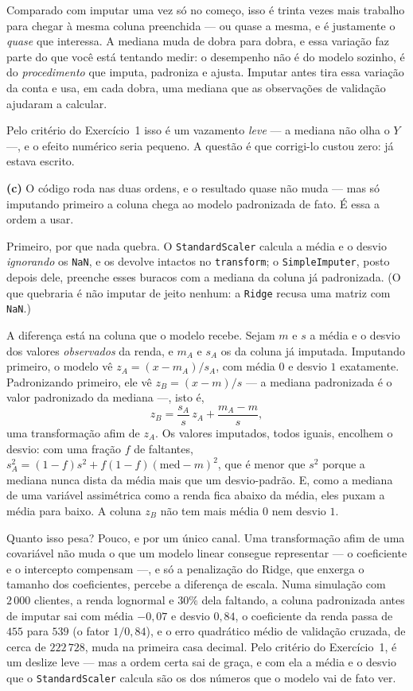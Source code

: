 \documentclass[11pt,a4paper]{article}
\begin{document}
\begin{solucao}
Comparado com imputar uma vez só no começo, isso é trinta vezes mais trabalho para
chegar à mesma coluna preenchida --- ou quase a mesma, e é justamente o
\emph{quase} que interessa. A mediana muda de dobra para dobra, e essa variação faz
parte do que você está tentando medir: o desempenho não é do modelo sozinho, é do
\emph{procedimento} que imputa, padroniza e ajusta. Imputar antes tira essa
variação da conta e usa, em cada dobra, uma mediana que as observações de
validação ajudaram a calcular.

Pelo critério do Exercício~1 isso é um vazamento \emph{leve} --- a mediana não olha
o $Y$ ---, e o efeito numérico seria pequeno. A questão é que corrigi-lo custou
zero: já estava escrito.

\smallskip
\textbf{(c)} O código roda nas duas ordens, e o resultado quase não muda --- mas
só imputando primeiro a coluna chega ao modelo padronizada de fato. É essa a ordem
a usar.

Primeiro, por que nada quebra. O \texttt{StandardScaler} calcula a média e o desvio
\emph{ignorando} os \texttt{NaN}, e os devolve intactos no \texttt{transform}; o
\texttt{SimpleImputer}, posto depois dele, preenche esses buracos com a mediana da
coluna já padronizada. (O que quebraria é não imputar de jeito nenhum: a
\texttt{Ridge} recusa uma matriz com \texttt{NaN}.)

A diferença está na coluna que o modelo recebe. Sejam $m$ e $s$ a média e o desvio
dos valores \emph{observados} da renda, e $m_A$ e $s_A$ os da coluna já imputada.
Imputando primeiro, o modelo vê $z_A=(x-m_A)/s_A$, com média $0$ e desvio $1$
exatamente. Padronizando primeiro, ele vê $z_B=(x-m)/s$ --- a mediana padronizada é
o valor padronizado da mediana ---, isto é,
\[
  z_B = \frac{s_A}{s}\,z_A + \frac{m_A-m}{s} ,
\]
uma transformação afim de $z_A$. Os valores imputados, todos iguais, encolhem o
desvio: com uma fração $f$ de faltantes,
$s_A^2=(1-f)s^2+f(1-f)(\mathrm{med}-m)^2$, que é menor que $s^2$ porque a mediana
nunca dista da média mais que um desvio-padrão. E, como a mediana de uma variável
assimétrica como a renda fica abaixo da média, eles puxam a média para baixo. A
coluna $z_B$ não tem mais média $0$ nem desvio $1$.

Quanto isso pesa? Pouco, e por um único canal. Uma transformação afim de uma
covariável não muda o que um modelo linear consegue representar --- o coeficiente e
o intercepto compensam ---, e só a penalização do Ridge, que enxerga o tamanho dos
coeficientes, percebe a diferença de escala. Numa simulação com $2\,000$ clientes, a
renda lognormal e $30\%$ dela faltando, a coluna padronizada antes de imputar sai com
média $-0{,}07$ e desvio $0{,}84$, o coeficiente da renda passa de $455$ para $539$
(o fator $1/0{,}84$), e o erro quadrático médio de validação cruzada, de cerca de
$222\,728$, muda na primeira casa decimal. Pelo critério
do Exercício~1, é um deslize leve --- mas a ordem certa sai de graça, e com ela a
média e o desvio que o \texttt{StandardScaler} calcula são os dos números que o
modelo vai de fato ver.
\end{solucao}
\end{document}
